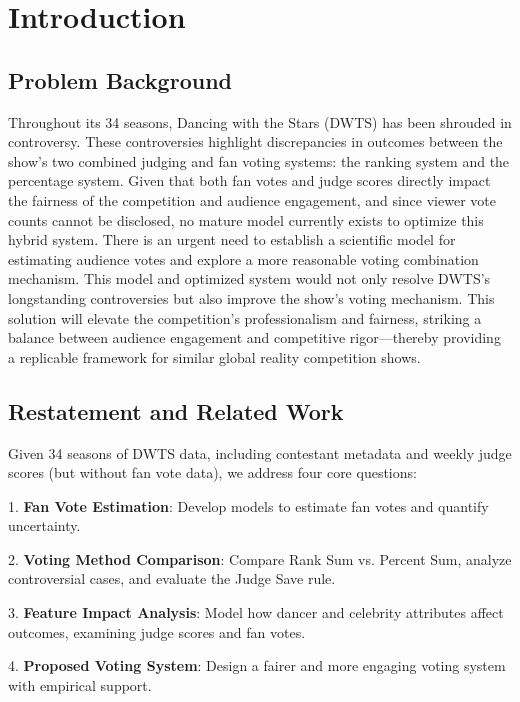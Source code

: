 \documentclass{mcmthesis}
\begin{document}
\maketitle
\tableofcontents
\newpage

\section{Introduction}
\subsection{Problem Background}

Throughout its 34 seasons, Dancing with the Stars (DWTS) has been shrouded in controversy.
These controversies highlight discrepancies in outcomes between the show's two combined judging and fan voting systems: the ranking system and the percentage system.
Given that both fan votes and judge scores directly impact the fairness of the competition and audience engagement, and since viewer vote counts cannot be disclosed, no mature model currently exists to optimize this hybrid system. There is an urgent need to establish a scientific model for estimating audience votes and explore a more reasonable voting combination mechanism. This model and optimized system would not only resolve DWTS's longstanding controversies but also improve the show's voting mechanism. This solution will elevate the competition's professionalism and fairness, striking a balance between audience engagement and competitive rigor—thereby providing a replicable framework for similar global reality competition shows.
\subsection{Restatement and Related Work}

Given 34 seasons of DWTS data, including contestant metadata and weekly judge scores (but without fan vote data), we address four core questions:  
\par1. \textbf{Fan Vote Estimation}: Develop models to estimate fan votes and quantify uncertainty.  
\par2. \textbf{Voting Method Comparison}: Compare Rank Sum vs. Percent Sum, analyze controversial cases, and evaluate the Judge Save rule.  
\par3. \textbf{Feature Impact Analysis}: Model how dancer and celebrity attributes affect outcomes, examining judge scores and fan votes.  
\par4. \textbf{Proposed Voting System}: Design a fairer and more engaging voting system with empirical support.
\end{document}
